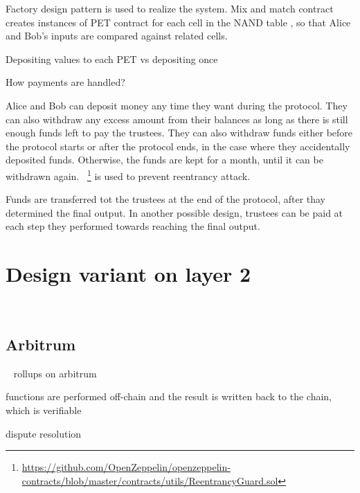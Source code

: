 Factory design pattern is used to realize the system. Mix and match contract creates instances of PET contract for each cell in the NAND table , so that Alice and Bob's inputs are compared against related cells.

Depositing values to each PET vs depositing once

How payments are handled? 

Alice and Bob can deposit money any time they want during the protocol. They can also withdraw any excess amount from their balances as long as there is still enough funds left to pay the trustees. They can also withdraw funds either before the protocol starts or after the protocol ends, in the case where they accidentally deposited funds. Otherwise, the funds are kept for a month, until it can be withdrawn again. ~\footnote{\url{https://github.com/OpenZeppelin/openzeppelin-contracts/blob/master/contracts/utils/ReentrancyGuard.sol}} is used to prevent reentrancy attack.

Funds are transferred tot the trustees at the end of the protocol, after thay determined the final output. In another possible design, trustees can be paid at each step they performed towards reaching the final output.


\section{Design variant on layer 2 }
\label{sec:arb}

~\subsection{Arbitrum}
~\cite{kalodner2018arbitrum}
rollups on arbitrum

functions are performed off-chain and the result is written back to the chain, which is verifiable

dispute resolution



